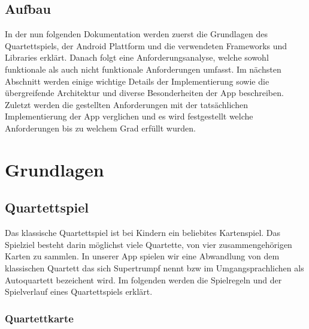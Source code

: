 \documentclass{scrartcl}
\begin{document}
\subsection{Aufbau}

In der nun folgenden Dokumentation werden zuerst die Grundlagen des
Quartettspiels, der Android Plattform und die verwendeten Frameworks und
Libraries erklärt. Danach folgt eine Anforderungsanalyse, welche sowohl
funktionale als auch nicht funktionale Anforderungen umfasst. Im nächsten
Abschnitt werden einige wichtige Details der Implementierung sowie die
übergreifende Architektur und diverse Besonderheiten der App beschreiben.
Zuletzt werden die gestellten Anforderungen mit der tatsächlichen
Implementierung der App verglichen und es wird festgestellt welche Anforderungen
bis zu welchem Grad erfüllt wurden.

\section{Grundlagen}
\subsection{Quartettspiel}


Das klassische Quartettspiel ist bei Kindern ein beliebites Kartenspiel. Das 
Spielziel besteht darin möglichst viele Quartette, von vier  zusammengehörigen 
Karten zu sammlen. In unserer App spielen wir eine Abwandlung von dem klassischen
Quartett das sich Supertrumpf nennt bzw im Umgangsprachlichen als Autoquartett 
bezeichent wird. Im folgenden werden die Spielregeln und der Spielverlauf eines 
Quartettspiels erklärt.

\subsubsection{Quartettkarte}



\end{document}
